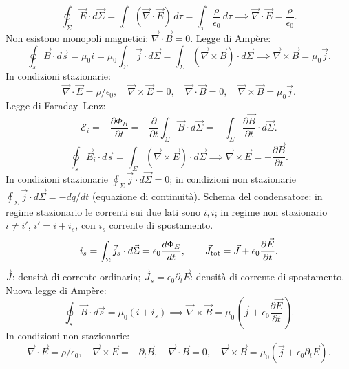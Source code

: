 \documentclass[11pt,a4paper]{article}
\newcommand{\pagina}[1]{\clearpage}
\newcommand{\vv}[1]{\vec{#1}}
\begin{document}
\[\oint_\Sigma\vv E\cdot d\vv\Sigma=\int_\tau(\vv\nabla\cdot\vv E)\,d\tau=\int_\tau\frac\rho{\epsilon_0}\,d\tau\implies\vv\nabla\cdot\vv E=\frac\rho{\epsilon_0}.\]
Non esistono monopoli magnetici: $\vv\nabla\cdot\vv B=0$.
Legge di Ampère:
\[\oint_s\vv B\cdot d\vv s=\mu_0i=\mu_0\int_\Sigma\vv j\cdot d\vv\Sigma=\int_\Sigma(\vv\nabla\times\vv B)\cdot d\vv\Sigma\implies\vv\nabla\times\vv B=\mu_0\vv j.\]
In condizioni stazionarie:
\[\vv\nabla\cdot\vv E=\rho/\epsilon_0,\quad\vv\nabla\times\vv E=0,\quad\vv\nabla\cdot\vv B=0,\quad\vv\nabla\times\vv B=\mu_0\vv j.\]
Legge di Faraday--Lenz:
\[\mathcal E_i=-\frac{\partial\Phi_B}{\partial t}=-\frac\partial{\partial t}\int_\Sigma\vv B\cdot d\vv\Sigma=-\int_\Sigma\frac{\partial\vv B}{\partial t}\cdot d\vv\Sigma.\]
\[\oint_s\vv E_i\cdot d\vv s=\int_\Sigma(\vv\nabla\times\vv E)\cdot d\vv\Sigma
\implies\vv\nabla\times\vv E=-\frac{\partial\vv B}{\partial t}.\]
In condizioni stazionarie $\oint_\Sigma\vv j\cdot d\vv\Sigma=0$; in condizioni non stazionarie $\oint_\Sigma\vv j\cdot d\vv\Sigma=-dq/dt$ (equazione di continuità).
Schema del condensatore: in regime stazionario le correnti sui due lati sono $i,i$; in regime non stazionario $i\ne i'$, $i'=i+i_s$, con $i_s$ corrente di spostamento.
\pagina{4}
\[i_s=\int_\Sigma\vv j_s\cdot d\vv\Sigma=\epsilon_0\frac{d\Phi_E}{dt},\qquad\vv J_{\rm tot}=\vv J+\epsilon_0\frac{\partial\vv E}{\partial t}.\]
$\vv J$: densità di corrente ordinaria; $\vv J_s=\epsilon_0\partial_t\vv E$: densità di corrente di spostamento.
Nuova legge di Ampère:
\[\oint_s\vv B\cdot d\vv s=\mu_0(i+i_s)\implies\vv\nabla\times\vv B=\mu_0\left(\vv j+\epsilon_0\frac{\partial\vv E}{\partial t}\right).\]
In condizioni non stazionarie:
\[\vv\nabla\cdot\vv E=\rho/\epsilon_0,\quad\vv\nabla\times\vv E=-\partial_t\vv B,\quad\vv\nabla\cdot\vv B=0,\quad\vv\nabla\times\vv B=\mu_0(\vv j+\epsilon_0\partial_t\vv E).\]
\end{document}
